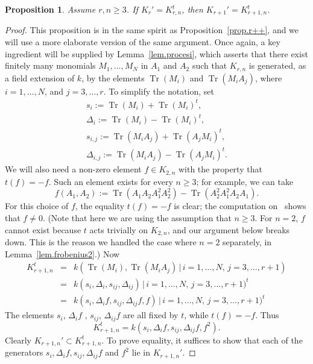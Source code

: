 \documentclass[12pt]{amsart}
\numberwithin{equation}{section}
\numberwithin{subsection}{section}
\newtheorem{proposition}[theorem]{Proposition}
\theoremstyle{definition} \newtheorem{definition}[theorem]{Definition}
\newcommand{\tr}{\operatorname{Tr}}
\begin{document}
\begin{proposition} \label{prop.r+++} 
Assume $r, n \geqslant 3$. 
If $K_{r}' = K_{r, n}^t$, then $K_{r + 1}' = K_{r+1, n}^t$.
\end{proposition}

\begin{proof} This proposition is in the same spirit as
Proposition~\ref{prop.r++}, and we will use a more elaborate 
version of the same argument. Once again, a key ingredient
will be supplied by Lemma~\ref{lem.procesi}, which asserts 
that there exist finitely many monomials
$M_1, \ldots, M_N$ in $A_1$ and $A_2$ such that $K_{r, n}$ is generated, 
as a field extension of $k$, by the elements 
$\tr(M_i)$ and $\tr(M_i A_j)$, where $i = 1, \dots, N$, and $j = 3, \dots, r$.
To simplify the notation, set
\begin{gather} 
\nonumber
s_i := \tr(M_i) + \tr(M_i)^t, \\
\nonumber
\Delta_i := \tr(M_i) - \tr(M_i)^t, \\
\nonumber
s_{i, j} := \tr(M_i A_j) + \tr(A_j M_i)^t, \\
\nonumber
\Delta_{i, j} := \tr(M_i A_j) - \tr(A_j M_i)^t.
\end{gather}
We will also need a non-zero element $f \in K_{2, n}$ with the property
that $t(f) = -f$. Such an element exists for every $n \geqslant 3$;
for example, we can take
\[ f(A_1, A_2) := \tr(A_1A_2A_1^2 A_2^2) -
\tr(A_2^2 A_1^2 A_2 A_1). \]
For this choice of $f$, the equality $t(f) = - f$ is clear;
the computation on~\cite[p.~72]{reichstein} shows that $f \neq 0$.
(Note that here we are using the assumption that $n \geqslant 3$.
For $n = 2$, $f$ cannot exist because $t$ acts trivially on $K_{2, n}$,
and our argument below breaks down.  This is the reason
we handled the case where $n = 2$ separately, 
in Lemma~\ref{lem.frobenius2}.) Now
\begin{align} 
\nonumber
K_{r+1, n}^t & = & k(\tr(M_i), \tr(M_i A_j) \, | \, i = 1, \dots, N, \,
j = 3, \dots, r+1 ) \\ 
\nonumber
   & = & k(s_i, \Delta_i, s_{ij}, \Delta_{ij}) \, 
| \, i = 1, \dots, N, \,   j = 3, \dots, r+1 )^t \\ 
\nonumber
 & = & k(s_i, \Delta_i f , s_{ij}, \Delta_{ij}f, f ) \, 
| \, i = 1, \dots, N, \,   j = 3, \dots, r+1 )^t  
\end{align}
The elements
$s_i$, $\Delta_i f$ , $s_{ij}$, $\Delta_{ij}f$ are all fixed by
$t$, while $t(f) = - f$. Thus
\begin{equation} \label{e++}
K_{r+1, n}^t = k(s_i, \Delta_i f , s_{ij}, \Delta_{ij}f, f^2 ) . 
\end{equation}
Clearly $K_{r+1, n}' \subset K_{r+1, n}^t$. To prove equality, 
it suffices to show that each of the generators
$s_i, \Delta_i f , s_{ij}, \Delta_{ij}f$ and $f^2$ lie in $K_{r+1, n}'$.
 

\end{proof}
\end{document}
